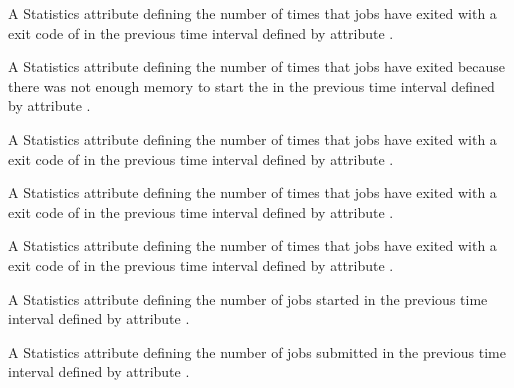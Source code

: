 \begin{description}
\item[\AdAttr{RecentJobsNotStarted}:] A Statistics attribute defining
  the number of times that jobs 
  have exited with a  exit code of 
  in the previous time interval defined by attribute .

\item[\AdAttr{RecentJobsShadowNoMemory}:] A Statistics attribute defining
  the number of times that jobs have exited 
  because there was not enough memory to start the 
  in the previous time interval defined by attribute .

\item[\AdAttr{RecentJobsShouldHold}:] A Statistics attribute defining
  the number of times that jobs
  have exited with a  exit code of 
  in the previous time interval defined by attribute .

\item[\AdAttr{RecentJobsShouldRemove}:] A Statistics attribute defining
  the number of times that jobs 
  have exited with a  exit code of 
  in the previous time interval defined by attribute .

\item[\AdAttr{RecentJobsShouldRequeue}:] A Statistics attribute defining
  the number of times that jobs 
  have exited with a  exit code of 
  in the previous time interval defined by attribute .

\item[\AdAttr{RecentJobsStarted}:] A Statistics attribute defining
  the number of jobs started
  in the previous time interval defined by attribute .

\item[\AdAttr{RecentJobsSubmitted}:] A Statistics attribute defining
  the number of jobs submitted
  in the previous time interval defined by attribute .


\end{description}
